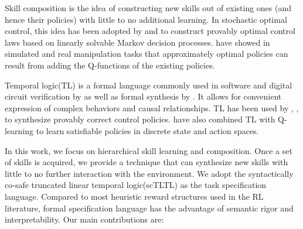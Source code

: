 \documentclass{article}
\begin{document}
Skill composition is the idea of constructing new skills out of existing ones (and hence their policies) with little to no additional learning. In stochastic optimal control, this idea has been adopted by \cite{todorov2009compositionality} and \cite{da2009linear} to construct provably optimal control laws based on linearly solvable Markov decision processes. \cite{haarnoja2018composable} have showed in simulated and real manipulation tasks that approximately optimal policies can result from adding the Q-functions of the existing policies. 


Temporal logic(TL) is a formal language commonly used in software and digital circuit verification by \cite{baier2008principles} as well as formal synthesis by \cite{belta2017formal}. It allows for convenient expression of complex behaviors and causal relationships. TL has been used by \cite{tabuada2004linear}, \cite{fainekos2006translating}, \cite{fainekos2005hybrid} to synthesize provably correct control policies. \cite{aksaray2016q} have also combined TL with Q-learning to learn satisfiable policies in discrete state and action spaces. 

In this work, we focus on hierarchical skill learning and composition. Once a set of skills is acquired, we provide a technique that can synthesize new skills with little to no further interaction with the environment.  We adopt the syntactically co-safe truncated linear temporal logic(scTLTL) as the task specification language. Compared to most heuristic reward structures used in the RL literature, formal specification language has the advantage of semantic rigor and interpretability. Our main contributions are:
\end{document}
